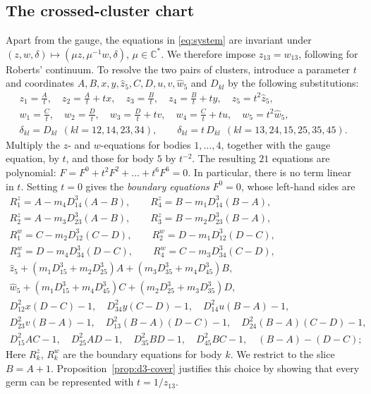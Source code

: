 \documentclass[11pt]{amsart}
\theoremstyle{definition}
\theoremstyle{remark}
\newcommand{\C}{\mathbb{C}}
\begin{document}
\subsection{The crossed-cluster chart}
{Apart from the gauge, the equations in \eqref{eq:system} are invariant under
$(z,w,\delta)\mapsto(\mu z,\mu^{-1}w,\delta)$, $\mu\in\C^*$. We therefore impose
$z_{13}=w_{13}$, following \cite[p.~543]{AK} for Roberts' continuum. To resolve the two pairs
of clusters, introduce a parameter $t$ and coordinates $A,B,x,y,\hat z_5,C,D,u,v,\hat w_5$ and $D_{kl}$
by the following substitutions:}
\begin{equation}\label{eq:d3-chart}
\begin{gathered}
z_1=\tfrac{A}{t},\quad z_2=\tfrac{A}{t}+tx,\quad z_3=\tfrac{B}{t},\quad z_4=\tfrac{B}{t}+ty,
\quad z_5=t^2\hat z_5,\\
w_1=\tfrac{C}{t},\quad w_2=\tfrac{D}{t},\quad w_3=\tfrac{D}{t}+tv,\quad w_4=\tfrac{C}{t}+tu,
\quad w_5=t^2\hat w_5,\\
\delta_{kl}=D_{kl}\ \ (kl=12,14,23,34),\qquad
\delta_{kl}=t\,D_{kl}\ \ (kl=13,24,15,25,35,45).
\end{gathered}
\end{equation}
{Multiply the $z$- and $w$-equations for bodies $1,\dots,4$, together with the gauge
equation, by $t$, and those for body $5$ by $t^{-2}$. The resulting $21$ equations are polynomial:
$F=F^0+t^2F^2+\dots+t^6F^6=0$. In particular, there is no term linear in $t$.
Setting $t=0$ gives the \emph{boundary equations} $F^0=0$, whose left-hand sides are}
\begin{equation}\label{eq:d3-boundary}
\begin{gathered}
R^z_1=A-m_4D_{14}^3(A-B),\qquad R^z_4=B-m_1D_{14}^3(B-A),\\
R^z_2=A-m_3D_{23}^3(A-B),\qquad R^z_3=B-m_2D_{23}^3(B-A),\\
R^w_1=C-m_2D_{12}^3(C-D),\qquad R^w_2=D-m_1D_{12}^3(D-C),\\
R^w_3=D-m_4D_{34}^3(D-C),\qquad R^w_4=C-m_3D_{34}^3(C-D),\\
\hat z_5+(m_1D_{15}^3+m_2D_{25}^3)A+(m_3D_{35}^3+m_4D_{45}^3)B,\\
\hat w_5+(m_1D_{15}^3+m_4D_{45}^3)C+(m_2D_{25}^3+m_3D_{35}^3)D,\\
D_{12}^2x(D-C)-1,\quad D_{34}^2y(C-D)-1,\quad D_{14}^2u(B-A)-1,\\
D_{23}^2v(B-A)-1,\quad D_{13}^2(B-A)(D-C)-1,\quad D_{24}^2(B-A)(C-D)-1,\\
D_{15}^2AC-1,\quad D_{25}^2AD-1,\quad D_{35}^2BD-1,\quad D_{45}^2BC-1,\quad (B-A)-(D-C);
\end{gathered}
\end{equation}
{Here $R^z_k$, $R^w_k$ are the boundary equations for body $k$.
We restrict to the slice $B=A+1$. Proposition~\ref{prop:d3-cover} justifies this choice
by showing that every germ can be represented with $t=1/z_{13}$.}
\end{document}
